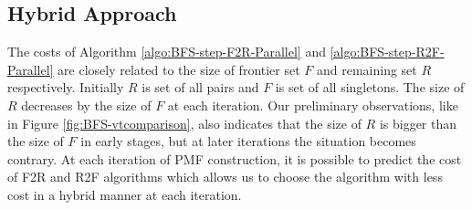\documentclass[12pt]{article}
\begin{document}
\subsection{Hybrid Approach}
\label{sec:BFS-Hybrid-parallel}
The costs of Algorithm \ref{algo:BFS-step-F2R-Parallel} and \ref{algo:BFS-step-R2F-Parallel} are closely related to the size of frontier set $F$ and remaining set $R$ respectively. Initially $R$ is set of all pairs and $F$ is set of all singletons. The size of $R$ decreases by the size of $F$ at each iteration. Our preliminary observations, like in Figure \ref{fig:BFS-vtcomparison}, also indicates that the size of $R$ is bigger than the size of $F$ in early stages, but at later iterations the situation becomes contrary. At each iteration of PMF construction, it is possible to predict the cost of F2R and R2F algorithms which allows us to choose the algorithm with less cost in a hybrid manner at each iteration. 
\end{document}
